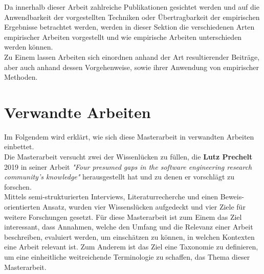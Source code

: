 Da innerhalb dieser Arbeit zahlreiche Publikationen gesichtet werden und auf die Anwendbarkeit der vorgestellten Techniken oder Übertragbarkeit der empirischen Ergebnisse betrachtet werden, werden in dieser Sektion die verschiedenen Arten empirischer Arbeiten vorgestellt und wie empirische Arbeiten unterschieden werden können. \\

Zu Einem lassen Arbeiten sich einordnen anhand der Art resultierender Beiträge, aber auch anhand dessen Vorgehenweise, sowie ihrer Anwendung von empirischer Methoden. \\




\section{Verwandte Arbeiten}
\label{sec:verwandt}

Im Folgendem wird erklärt, wie sich diese Masterarbeit in verwandten Arbeiten einbettet. \\

Die Masterarbeit versucht zwei der Wissenlücken zu füllen, die \textbf{Lutz Prechelt} 2019 in seiner Arbeit \textit{"Four presumed gaps in the software engineering research community's knowledge"} herausgestellt hat und zu denen er vorschlägt zu forschen. \cite{prechelt2019}\\
Mittels semi-strukturierten Interviews, Literaturrecherche und einen Beweis-orientierten Ansatz, wurden vier Wissenslücken aufgedeckt und vier Ziele für weitere Forschungen gesetzt. Für diese Masterarbeit ist zum Einem das Ziel interessant, dass Annahmen, welche den Umfang und die Relevanz einer Arbeit beschreiben, evaluiert werden, um einschätzen zu können, in welchen Kontexten eine Arbeit relevant ist. Zum Anderem ist das Ziel eine Taxonomie zu definieren, um eine einheitliche weitreichende Terminologie zu schaffen, das Thema dieser Masterarbeit. \\

